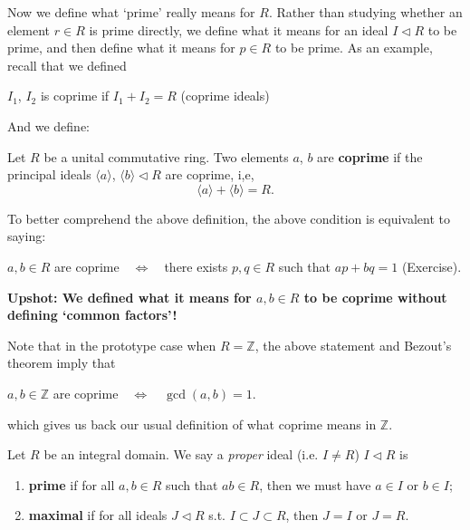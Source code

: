 Now we define what `prime' really means for $R$.
Rather than studying whether an element $r\in R$ is prime directly, we define what it means for an ideal $I\triangleleft R$ to be prime, and then define what it means for $p \in R$ to be prime. As an example, recall that we defined




\begin{center}
    $I_1$, $I_2$ is coprime if $I_1 + I_2 = R$ \quad \quad (coprime ideals)
\end{center}
And we define:
\begin{definition}
    Let $R$ be a unital commutative ring. Two elements $a$, $b$ are {\bf coprime} if the principal ideals $\langle a\rangle$, $\langle b \rangle \lhd R$ are coprime, i,e,
    $$\langle a \rangle + \langle b \rangle = R.$$
\end{definition}
To better comprehend the above definition, the above condition is equivalent to saying:
\begin{center}
    $a, b \in R$ are coprime\ \ $\Longleftrightarrow$\ \ there exists $p, q \in R$ such that $ap + bq = 1$ (Exercise).
\end{center}
{\bf Upshot: We defined what it means for $a, b \in R$ to be coprime without defining `common factors'!}

Note that in the prototype case when $R=\mathbb{Z}$, the above statement and Bezout's theorem imply that 
\begin{center}
$a, b \in \mathbb{Z}$ are coprime\ \ $\Longleftrightarrow$\ \ $\gcd(a,b)=1$.
\end{center}
which gives us back our usual definition of what coprime means in $\mathbb{Z}$. 

\begin{definition}
Let $R$ be an integral domain. We say a {\it proper} ideal (i.e. $I\neq R$) $I\triangleleft R$ is 
\begin{enumerate}
    \item \textbf{prime} if for all $a,b \in R$ such that $ab \in R$, then we must have $a\in I$ or $b\in I$;
    \item \textbf{maximal} if for all ideals $J\triangleleft R$ s.t. $I\subset J\subset R$, then $J=I$ or $J=R$.
\end{enumerate}
\end{definition}


